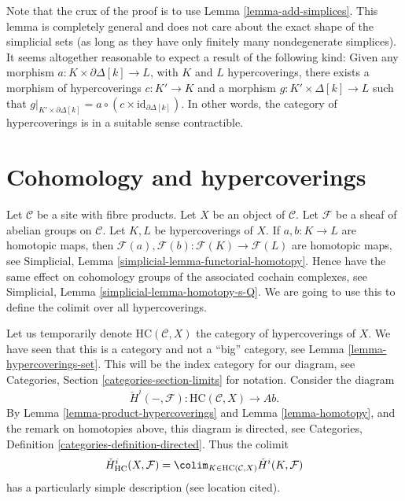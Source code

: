 \begin{remark}
\label{remark-contractible-category}
Note that the crux of the proof is to use
Lemma \ref{lemma-add-simplices}. This lemma
is completely general and does not care about the
exact shape of the simplicial sets (as long as they
have only finitely many nondegenerate simplices).
It seems altogether reasonable to expect a result
of the following kind:
Given any morphism $a : K \times \partial \Delta[k]
\to L$, with $K$ and $L$ hypercoverings, there
exists a morphism of hypercoverings $c : K' \to K$
and a morphism  $g : K' \times \Delta[k] \to L$
such that
$g|_{K' \times \partial \Delta[k]} =
a \circ (c \times \text{id}_{\partial \Delta[k]})$.
In other words, the category of hypercoverings is in
a suitable sense contractible.
\end{remark}

















\section{Cohomology and hypercoverings}
\label{section-cohomology}

\noindent
Let $\mathcal{C}$ be a site with fibre products.
Let $X$ be an object of $\mathcal{C}$.
Let $\mathcal{F}$ be a sheaf of abelian groups on $\mathcal{C}$.
Let $K, L$ be hypercoverings of $X$.
If $a, b : K \to L$ are homotopic maps,
then $\mathcal{F}(a), \mathcal{F}(b) : \mathcal{F}(K) \to \mathcal{F}(L)$
are homotopic maps, see
Simplicial, Lemma \ref{simplicial-lemma-functorial-homotopy}.
Hence have the same effect on cohomology groups of the associated
cochain complexes, see
Simplicial, Lemma \ref{simplicial-lemma-homotopy-s-Q}.
We are going to use this to define the colimit over all
hypercoverings.

\medskip\noindent
Let us temporarily denote $\text{HC}(\mathcal{C}, X)$
the category of hypercoverings of $X$. We have seen that
this is a category and not a ``big'' category,
see Lemma \ref{lemma-hypercoverings-set}.
This will be the index category for our diagram, see
Categories, Section \ref{categories-section-limits} for notation.
Consider the diagram
$$
\check{H}^i(-, \mathcal{F}) :
\text{HC}(\mathcal{C}, X)
\longrightarrow
\textit{Ab}.
$$
By Lemma \ref{lemma-product-hypercoverings} and
Lemma \ref{lemma-homotopy}, and the remark on homotopies above,
this diagram is directed, see
Categories, Definition \ref{categories-definition-directed}.
Thus the colimit
$$
\check{H}^i_{\text{HC}}(X, \mathcal{F})
=
\colim_{K \in \text{HC}(\mathcal{C}, X)}
\check{H}^i(K, \mathcal{F})
$$
has a particularly simple description (see location cited).

